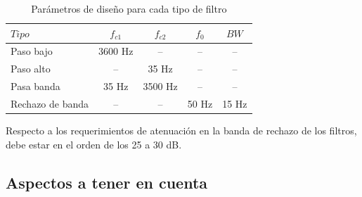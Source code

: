 \documentclass[12pt]{article}
\begin{document}
	\begin{table}[H]
		\centering
		\begin{tabular}{|l|c|c|c|c|}
			\hline
			\textbf{$Tipo$}      & \textbf{$f_{c1}$} & \textbf{$f_{c2}$} & \textbf{$f_{0}$} & \textbf{$BW$} \\
			\hline
			Paso bajo            & 3600 Hz              & --                    & --             & --          \\
			\hline
			Paso alto            & --                   & 35 Hz                 & --             & --          \\
			\hline
			Pasa banda           & 35 Hz                & 3500 Hz               & --             & --          \\
			\hline
			Rechazo de banda     & --                   & --                    & 50 Hz          & 15 Hz       \\
			\hline
		\end{tabular}
		\caption{Parámetros de diseño para cada tipo de filtro}
		\label{tabla:filtros}
	\end{table}
	
	Respecto a los requerimientos de atenuación en la banda de rechazo de los filtros, debe estar en el orden de los 25 a 30 dB.
	
	\subsection{Aspectos a tener en cuenta}
	
\end{document}
